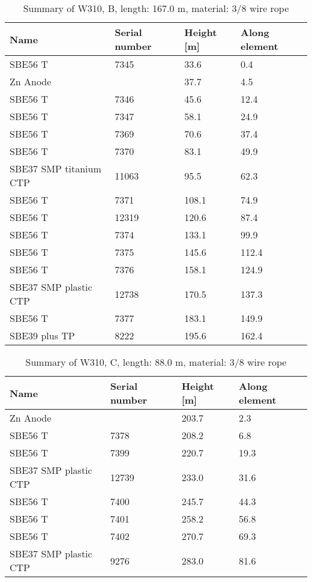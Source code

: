 \documentclass{article}
\begin{document}
\begin{table}[!htbp]
\centering
\caption{Summary of W310, B, length: 167.0 m, material: 3/8 wire rope}
\begin{tabular}{llll}
\toprule
Name & Serial number & Height [m] & Along element \\
\midrule
SBE56 T & 7345 & 33.6 & 0.4 \\
Zn Anode &  & 37.7 & 4.5 \\
SBE56 T & 7346 & 45.6 & 12.4 \\
SBE56 T & 7347 & 58.1 & 24.9 \\
SBE56 T & 7369 & 70.6 & 37.4 \\
SBE56 T & 7370 & 83.1 & 49.9 \\
SBE37 SMP titanium CTP & 11063 & 95.5 & 62.3 \\
SBE56 T & 7371 & 108.1 & 74.9 \\
SBE56 T & 12319 & 120.6 & 87.4 \\
SBE56 T & 7374 & 133.1 & 99.9 \\
SBE56 T & 7375 & 145.6 & 112.4 \\
SBE56 T & 7376 & 158.1 & 124.9 \\
SBE37 SMP plastic CTP & 12738 & 170.5 & 137.3 \\
SBE56 T & 7377 & 183.1 & 149.9 \\
SBE39 plus TP & 8222 & 195.6 & 162.4 \\
\bottomrule
\end{tabular}
\end{table}

\begin{table}[!htbp]
\centering
\caption{Summary of W310, C, length: 88.0 m, material: 3/8 wire rope}
\begin{tabular}{llll}
\toprule
Name & Serial number & Height [m] & Along element \\
\midrule
Zn Anode &  & 203.7 & 2.3 \\
SBE56 T & 7378 & 208.2 & 6.8 \\
SBE56 T & 7399 & 220.7 & 19.3 \\
SBE37 SMP plastic CTP & 12739 & 233.0 & 31.6 \\
SBE56 T & 7400 & 245.7 & 44.3 \\
SBE56 T & 7401 & 258.2 & 56.8 \\
SBE56 T & 7402 & 270.7 & 69.3 \\
SBE37 SMP plastic CTP & 9276 & 283.0 & 81.6 \\
\bottomrule
\end{tabular}
\end{table}
\end{document}
